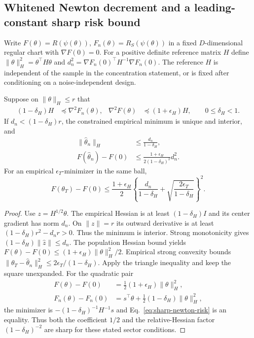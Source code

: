 \subsection{Whitened Newton decrement and a leading-constant sharp risk bound}
\label{app:sharp-statistics}
Write $F(\theta)=R(\psi(\theta))$, $F_n(\theta)=R_S(\psi(\theta))$
in a fixed $D$-dimensional regular chart with $\nabla F(0)=0$.
For a positive definite reference matrix $H$ define
$\|\theta\|_H^2=\theta^\top H\theta$ and
$d_n^2=\nabla F_n(0)^\top H^{-1}\nabla F_n(0)$.
The reference $H$ is independent of the sample in the concentration
statement, or is fixed after conditioning on a noise-independent design.

\begin{theorem}
\label{thm:sharp-newton-risk}
Suppose on $\|\theta\|_H\leq r$ that
\begin{align}
(1-\delta_H)H&\preceq\nabla^2F_n(\theta),&
\nabla^2F(\theta)&\preceq(1+\epsilon_H)H,
\qquad 0\leq\delta_H<1 .
\end{align}
If $d_n<(1-\delta_H)r$, the constrained empirical minimum is unique
and interior, and
\begin{align}
\|\widehat\theta_n\|_H&\leq\frac{d_n}{1-\delta_H},\\
F(\widehat\theta_n)-F(0)
&\leq\frac{1+\epsilon_H}{2(1-\delta_H)^2}d_n^2 .
\label{eq:sharp-newton-risk}
\end{align}
For an empirical $\epsilon_T$-minimizer in the same ball,
\begin{equation}
F(\theta_T)-F(0)
\leq\frac{1+\epsilon_H}{2}
\left\{\frac{d_n}{1-\delta_H}
+\sqrt{\frac{2\epsilon_T}{1-\delta_H}}\right\}^{\!2}.
\label{eq:sharp-optimization-statistics}
\end{equation}
\end{theorem}
\begin{proof}
Use $z=H^{1/2}\theta$. The empirical Hessian is at least
$(1-\delta_H)I$ and its center gradient has norm $d_n$.
On $\|z\|=r$ its outward derivative is at least
$(1-\delta_H)r^2-d_nr>0$. Thus the minimum is interior.
Strong monotonicity gives
$(1-\delta_H)\|\widehat z\|\leq d_n$.
The population Hessian bound yields
$F(\theta)-F(0)\leq(1+\epsilon_H)\|\theta\|_H^2/2$.
Empirical strong convexity bounds
$\|\theta_T-\widehat\theta_n\|_H^2
\leq2\epsilon_T/(1-\delta_H)$.
Apply the triangle inequality and keep the square unexpanded.
For the quadratic pair
\begin{align}
F(\theta)-F(0)&=\tfrac12(1+\epsilon_H)\|\theta\|_H^2,\\
F_n(\theta)-F_n(0)&=s^\top\theta+
\tfrac12(1-\delta_H)\|\theta\|_H^2,
\end{align}
the minimizer is $-(1-\delta_H)^{-1}H^{-1}s$ and
Eq.~\eqref{eq:sharp-newton-risk} is an equality.
Thus both the coefficient $1/2$ and the relative-Hessian factor
$(1-\delta_H)^{-2}$ are sharp for these stated sector conditions.
\end{proof}

